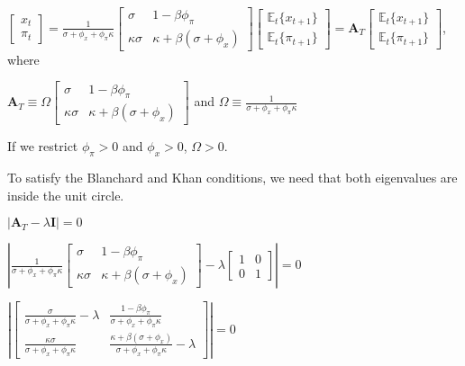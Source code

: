 \documentclass[
]{article}
\begin{document}
\(\displaystyle \left[ \begin{matrix} x_t\\ \pi_t \end{matrix} \right] =\frac{1}{\sigma+\phi_x + \phi_\pi \kappa}\left[ \begin{matrix} \sigma& 1-\beta \phi_\pi\\ \kappa \sigma & \kappa+\beta (\sigma+\phi_x) \end{matrix} \right] \left[ \begin{matrix} \mathbb{E}_t\{x_{t+1} \}\\ \mathbb{E}_t \{\pi_{t+1} \} \end{matrix} \right]=\mathbf{A}_T\left[ \begin{matrix} \mathbb{E}_t\{x_{t+1} \}\\ \mathbb{E}_t \{\pi_{t+1} \} \end{matrix} \right]\),
where

\(\displaystyle \mathbf{A}_T \equiv\Omega\left[ \begin{matrix} \sigma& 1-\beta \phi_\pi\\ \kappa \sigma & \kappa+\beta (\sigma+\phi_x) \end{matrix} \right]\)
and
\(\displaystyle \Omega \equiv\frac{1}{\sigma+\phi_x + \phi_\pi\kappa}\)

If we restrict \(\phi_\pi>0\) and \(\phi_x>0\), \(\Omega>0\).

To satisfy the Blanchard and Khan conditions, we need that both
eigenvalues are inside the unit circle.

\(|\mathbf{A}_T-\lambda \mathbf{I}| = 0\)

\(\displaystyle \left| \frac{1}{\sigma+\phi_x + \phi_\pi \kappa}\left[ \begin{matrix} \sigma & 1-\beta \phi_\pi\\ \kappa \sigma & \kappa+\beta (\sigma+\phi_x) \end{matrix} \right] -\lambda \left[ \begin{matrix} 1 & 0\\ 0 & 1 \end{matrix} \right] \right|=0\)

\(\displaystyle \left| \left[ \begin{matrix} \displaystyle \frac{\sigma}{\sigma+\phi_x + \phi_\pi \kappa}-\lambda & \displaystyle \frac{1-\beta \phi_\pi}{\sigma+\phi_x + \phi_\pi \kappa}\\ \displaystyle \frac{\kappa \sigma}{\sigma+\phi_x + \phi_\pi \kappa} & \displaystyle \frac{\kappa+\beta (\sigma+\phi_x)}{\sigma+\phi_x + \phi_\pi \kappa}-\lambda \end{matrix} \right] \right|=0\)
\end{document}
